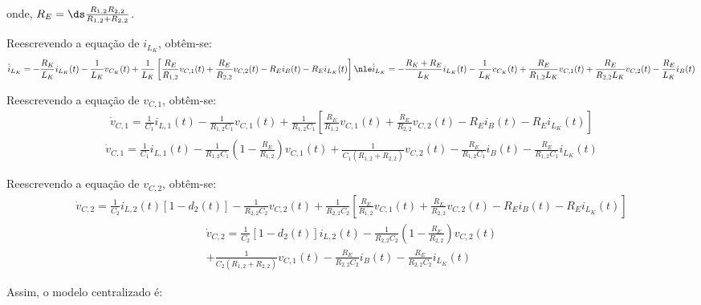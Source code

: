 onde, $R_E = \ds \frac{R_{1,2}R_{2,2}}{R_{1,2} + R_{2,2}}$.

\vspace*{8pt}

Reescrevendo a equação de $i_{L_K}$, obtêm-se:
\begin{gather}
  \dot{i}_{L_K} =  - \frac{R_K}{L_K} i_{L_K}(t) - \frac{1}{L_K} v_{C_K}(t) + \frac{1}{L_K} \left[\frac{R_E}{R_{1,2}} v_{C,1}(t) + \frac{R_E}{R_{2,2}} v_{C,2}(t) - R_E i_B(t) - R_E i_{L_K}(t)\right] \nle
  \dot{i}_{L_K} =  - \frac{R_K + R_E}{L_K} i_{L_K}(t) - \frac{1}{L_K} v_{C_K}(t) + \frac{R_E}{R_{1,2} L_K} v_{C,1}(t) + \frac{R_E}{R_{2,2} L_K} v_{C,2}(t) - \frac{R_E}{L_K} i_B(t)
\end{gather}

Reescrevendo a equação de $v_{C,1}$, obtêm-se:
\begin{gather*}
  \dot{v}_{C,1} = \frac{1}{C_1} i_{L,1}(t) - \frac{1}{R_{1,2}C_1} v_{C,1}(t) + \frac{1}{R_{1,2} C_1} \left[\frac{R_E}{R_{1,2}} v_{C,1}(t) + \frac{R_E}{R_{2,2}} v_{C,2}(t) - R_E i_B(t) - R_E i_{L_K}(t)\right]
\end{gather*}
\begin{gather}
  \dot{v}_{C,1} = \frac{1}{C_1} i_{L,1}(t) - \frac{1}{R_{1,2}C_1} \left(1  - \frac{R_E}{R_{1,2}}\right) v_{C,1}(t) +\frac{1}{C_1 (R_{1,2} + R_{2,2})} v_{C,2}(t) - \frac{R_E}{R_{1,2}C_1} i_B(t) - \frac{R_E}{R_{1,2}C_1} i_{L_K}(t)
\end{gather}

Reescrevendo a equação de $v_{C,2}$, obtêm-se:
\begin{gather*}
  \dot{v}_{C,2} = \frac{1}{C_2} i_{L,2}(t) \left[1 - d_2(t)\right] - \frac{1}{R_{2,2} C_2} v_{C,2}(t) + \frac{1}{R_{2,2} C_2} \left[\frac{R_E}{R_{1,2}} v_{C,1}(t) + \frac{R_E}{R_{2,2}} v_{C,2}(t) - R_E i_B(t) - R_E i_{L_K}(t)\right]
\end{gather*}
\begin{multline}
  \dot{v}_{C,2} = \frac{1}{C_2} \left[1 - d_2(t)\right] i_{L,2}(t)
  - \frac{1}{R_{2,2} C_2} \left(1 - \frac{R_E}{R_{2,2}}\right) v_{C,2}(t)\\
  + \frac{1}{C_2 (R_{1,2} + R_{2,2})} v_{C,1}(t)
  - \frac{R_E}{R_{2,2}C_2} i_B(t) - \frac{R_E}{R_{2,2}C_2} i_{L_K}(t)
\end{multline}

Assim, o modelo centralizado é:


